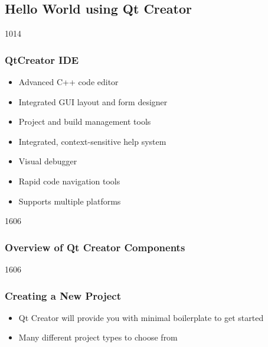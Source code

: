 %
%
%
%

\subsection{Hello World using Qt Creator}

\begin{slide}{1014}\frametitle{QtCreator IDE} \label{qtcreator}
\begin{itemize}
  \item Advanced C++ code editor
  \item Integrated GUI layout and form designer
  \item Project and build management tools
  \item Integrated, context-sensitive help system
  \item Visual debugger
  \item Rapid code navigation tools
  \item Supports multiple platforms
  \end{itemize}
\end{slide}


\begin{slide}{1606}
  \frametitle{Overview of Qt Creator Components}
\end{slide}

\begin{slide}{1606}
  \frametitle{Creating a New Project}
 \begin{itemize}
 \item Qt Creator will provide you with minimal boilerplate to get started
 \item Many different project types to choose from
 \end{itemize}
\end{slide}

